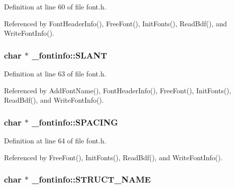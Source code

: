 Definition at line 60 of file font.\-h.



Referenced by Font\-Header\-Info(), Free\-Font(), Init\-Fonts(), Read\-Bdf(), and Write\-Font\-Info().

\hypertarget{struct__fontinfo_aff56d18df3b46ec10896d15ad3a2e164}{
\subsubsection[{S\-L\-A\-N\-T}]{\setlength{\rightskip}{0pt plus 5cm}char $\ast$ \-\_\-fontinfo\-::\-S\-L\-A\-N\-T}}\label{struct__fontinfo_aff56d18df3b46ec10896d15ad3a2e164}


Definition at line 63 of file font.\-h.



Referenced by Add\-Font\-Name(), Font\-Header\-Info(), Free\-Font(), Init\-Fonts(), Read\-Bdf(), and Write\-Font\-Info().

\hypertarget{struct__fontinfo_a0e6fafc8f03c70ce9c506d7a506fbba4}{
\subsubsection[{S\-P\-A\-C\-I\-N\-G}]{\setlength{\rightskip}{0pt plus 5cm}char $\ast$ \-\_\-fontinfo\-::\-S\-P\-A\-C\-I\-N\-G}}\label{struct__fontinfo_a0e6fafc8f03c70ce9c506d7a506fbba4}


Definition at line 64 of file font.\-h.



Referenced by Free\-Font(), Init\-Fonts(), Read\-Bdf(), and Write\-Font\-Info().

\hypertarget{struct__fontinfo_a861ecb4b5f190ccd1e71b38270240f86}{
\subsubsection[{S\-T\-R\-U\-C\-T\-\_\-\-N\-A\-M\-E}]{\setlength{\rightskip}{0pt plus 5cm}char $\ast$ \-\_\-fontinfo\-::\-S\-T\-R\-U\-C\-T\-\_\-\-N\-A\-M\-E}}\label{struct__fontinfo_a861ecb4b5f190ccd1e71b38270240f86}


